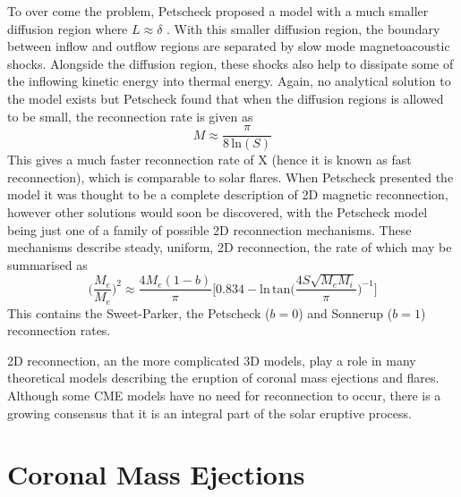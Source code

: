 To over come the problem, Petscheck proposed a model with a much smaller diffusion region where $L\approx\delta$ \citep{petschek1964} . With this smaller diffusion region, the boundary between inflow and outflow regions are separated by slow mode magnetoacoustic shocks. Alongside the diffusion region, these shocks also help to dissipate some of the inflowing kinetic energy into thermal energy. Again, no analytical solution to the model exists but Petscheck found that when the diffusion regions is allowed to be small, the reconnection rate is given as
\begin{equation}
M \approx \frac{\pi}{8\,\mathrm{ln}(S)}
\end{equation}
This gives a much faster reconnection rate of X (hence it is known as fast reconnection), which is comparable to solar flares. When Petscheck presented the model it was thought to be a complete description of 2D magnetic reconnection, however other solutions would soon be discovered, with the Petscheck model being just one of a family of possible 2D reconnection mechanisms. These mechanisms describe steady, uniform, 2D reconnection, the rate of which may be summarised as \citep{priest1986}
\begin{equation}
\bigg(\frac{M_e}{M_e}\bigg)^2 \approx \frac{4M_e(1-b)}{\pi}\bigg[ 0.834 -\mathrm{ln \, tan}\bigg( \frac {4S\sqrt{M_eM_i}} {\pi}  \bigg)^{-1}\bigg]
\end{equation}
This contains the Sweet-Parker, the Petscheck ($b=0$) and Sonnerup \citep{sonnerup1970}($b=1$) reconnection rates.

2D reconnection, an the more complicated 3D models, play a role in many theoretical models describing the eruption of coronal mass ejections and flares. Although some CME models have no need for reconnection to occur, there is a growing consensus that it is an integral part of the solar eruptive process.


\section{Coronal Mass Ejections}\label{sec:2}

